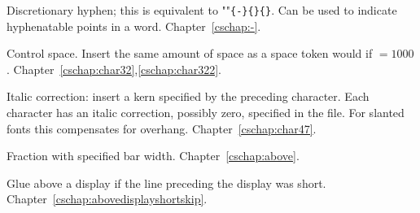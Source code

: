 \begin{glossinventory}

\item [\cs{-}]
      Discretionary hyphen; this is
      equivalent to ""\verb|{-}{}{}|.
      Can be used to indicate hyphenatable points in a word. 
Chapter~\ref{cschap:-}.

\item [\cs{char32}]
      Control space.
      Insert the same amount of space as a space token would
 \alt
      if ${}=1000$.
Chapter~\ref{cschap:char32},\ref{cschap:char322}.

\item [\cs{char47}]
      Italic correction: insert a kern specified by the
      preceding character.
      Each character has an italic correction, possibly zero,
      specified in the  file.
      For slanted fonts this compensates for overhang.
Chapter~\ref{cschap:char47}.

\item [\cs{above\gr{dimen}}]
      Fraction with specified bar width. 
Chapter~\ref{cschap:above}.

\item [\cs{abovedisplayshortskip}]
      Glue above a display if the line preceding the display was short.
Chapter~\ref{cschap:abovedisplayshortskip}.


\end{glossinventory}
